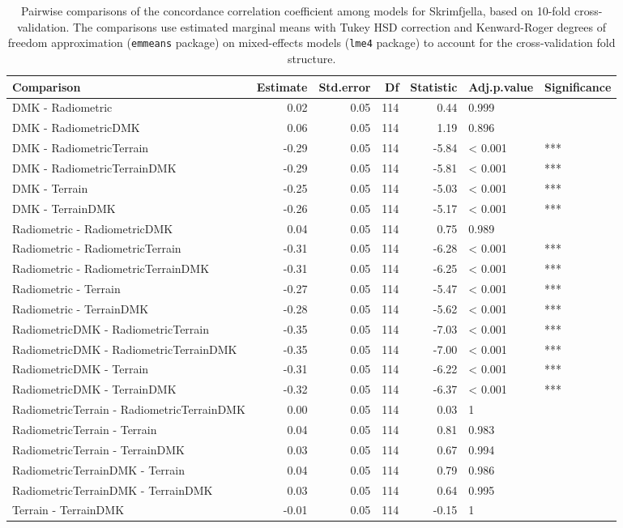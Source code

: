 \documentclass[soil, manuscript]{copernicus}
\begin{document}
\section{}

\begin{table}[h]

\caption{\label{tab:pairwiseSkrimCCC}Pairwise comparisons of the concordance correlation coefficient among models for Skrimfjella, based on 10-fold cross-validation. The comparisons use estimated marginal means with Tukey HSD correction and Kenward-Roger degrees of freedom approximation (\texttt{emmeans} package) on mixed-effects models (\texttt{lme4} package) to account for the cross-validation fold structure.}
\centering
\begin{tabular}[t]{lrrrrll}
\hline
Comparison & Estimate & Std.error & Df & Statistic & Adj.p.value & Significance\\
\hline
DMK - Radiometric & 0.02 & 0.05 & 114 & 0.44 & 0.999 & \\
DMK - RadiometricDMK & 0.06 & 0.05 & 114 & 1.19 & 0.896 & \\
DMK - RadiometricTerrain & -0.29 & 0.05 & 114 & -5.84 & < 0.001 & ***\\
DMK - RadiometricTerrainDMK & -0.29 & 0.05 & 114 & -5.81 & < 0.001 & ***\\
DMK - Terrain & -0.25 & 0.05 & 114 & -5.03 & < 0.001 & ***\\
DMK - TerrainDMK & -0.26 & 0.05 & 114 & -5.17 & < 0.001 & ***\\
Radiometric - RadiometricDMK & 0.04 & 0.05 & 114 & 0.75 & 0.989 & \\
Radiometric - RadiometricTerrain & -0.31 & 0.05 & 114 & -6.28 & < 0.001 & ***\\
Radiometric - RadiometricTerrainDMK & -0.31 & 0.05 & 114 & -6.25 & < 0.001 & ***\\
Radiometric - Terrain & -0.27 & 0.05 & 114 & -5.47 & < 0.001 & ***\\
Radiometric - TerrainDMK & -0.28 & 0.05 & 114 & -5.62 & < 0.001 & ***\\
RadiometricDMK - RadiometricTerrain & -0.35 & 0.05 & 114 & -7.03 & < 0.001 & ***\\
RadiometricDMK - RadiometricTerrainDMK & -0.35 & 0.05 & 114 & -7.00 & < 0.001 & ***\\
RadiometricDMK - Terrain & -0.31 & 0.05 & 114 & -6.22 & < 0.001 & ***\\
RadiometricDMK - TerrainDMK & -0.32 & 0.05 & 114 & -6.37 & < 0.001 & ***\\
RadiometricTerrain - RadiometricTerrainDMK & 0.00 & 0.05 & 114 & 0.03 & 1 & \\
RadiometricTerrain - Terrain & 0.04 & 0.05 & 114 & 0.81 & 0.983 & \\
RadiometricTerrain - TerrainDMK & 0.03 & 0.05 & 114 & 0.67 & 0.994 & \\
RadiometricTerrainDMK - Terrain & 0.04 & 0.05 & 114 & 0.79 & 0.986 & \\
RadiometricTerrainDMK - TerrainDMK & 0.03 & 0.05 & 114 & 0.64 & 0.995 & \\
Terrain - TerrainDMK & -0.01 & 0.05 & 114 & -0.15 & 1 & \\
\hline
\end{tabular}
\end{table}
\end{document}
